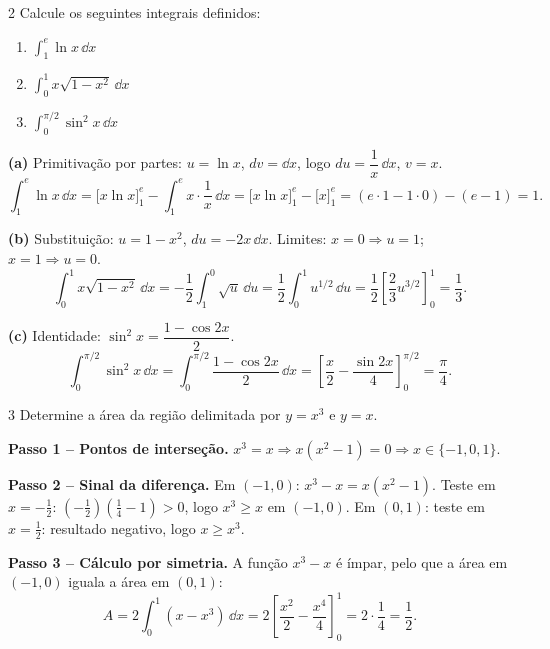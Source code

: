 \begin{exercisebox}{2}
  Calcule os seguintes integrais definidos:
  \begin{enumerate}[label=(\alph*)]
    \item $\displaystyle\int_1^e \ln x\,\dd x$
    \item $\displaystyle\int_0^1 x\sqrt{1-x^2}\,\dd x$
    \item $\displaystyle\int_0^{\pi/2}\sin^2 x\,\dd x$
  \end{enumerate}
\end{exercisebox}
\begin{solbox}
  \textbf{(a)} Primitivação por partes: $u=\ln x$, $dv=\dd x$, logo
  $du=\dfrac{1}{x}\,\dd x$, $v=x$.
  \[
    \int_1^e \ln x\,\dd x = \Big[x\ln x\Big]_1^e - \int_1^e x\cdot\frac{1}{x}\,\dd x
    = \Big[x\ln x\Big]_1^e - \Big[x\Big]_1^e
    = (e\cdot 1 - 1\cdot 0)-(e-1) = 1.
  \]

  \textbf{(b)} Substituição: $u=1-x^2$, $du=-2x\,\dd x$.
  Limites: $x=0\Rightarrow u=1$; $x=1\Rightarrow u=0$.
  \[
    \int_0^1 x\sqrt{1-x^2}\,\dd x = -\frac{1}{2}\int_1^0 \sqrt{u}\,\dd u
    = \frac{1}{2}\int_0^1 u^{1/2}\,\dd u
    = \frac{1}{2}\left[\frac{2}{3}u^{3/2}\right]_0^1 = \frac{1}{3}.
  \]

  \textbf{(c)} Identidade: $\sin^2 x = \dfrac{1-\cos 2x}{2}$.
  \[
    \int_0^{\pi/2}\sin^2 x\,\dd x = \int_0^{\pi/2}\frac{1-\cos 2x}{2}\,\dd x
    = \left[\frac{x}{2}-\frac{\sin 2x}{4}\right]_0^{\pi/2}
    = \frac{\pi}{4}.
  \]
\end{solbox}

\begin{exercisebox}{3}
  Determine a área da região delimitada por $y=x^3$ e $y=x$.
\end{exercisebox}
\begin{solbox}
  \textbf{Passo 1 -- Pontos de interseção.} $x^3=x \Rightarrow x(x^2-1)=0
  \Rightarrow x\in\{-1,0,1\}$.

  \textbf{Passo 2 -- Sinal da diferença.} Em $(-1,0)$: $x^3-x = x(x^2-1)$.
  Teste em $x=-\tfrac{1}{2}$: $(-\tfrac{1}{2})({\tfrac{1}{4}-1})>0$,
  logo $x^3\geq x$ em $(-1,0)$.
  Em $(0,1)$: teste em $x=\tfrac{1}{2}$: resultado negativo, logo $x\geq x^3$.

  \textbf{Passo 3 -- Cálculo por simetria.} A função $x^3-x$ é ímpar, pelo que
  a área em $(-1,0)$ iguala a área em $(0,1)$:
  \[
    A = 2\int_0^1(x-x^3)\,\dd x = 2\left[\frac{x^2}{2}-\frac{x^4}{4}\right]_0^1
    = 2\cdot\frac{1}{4} = \frac{1}{2}.
  \]
\end{solbox}

